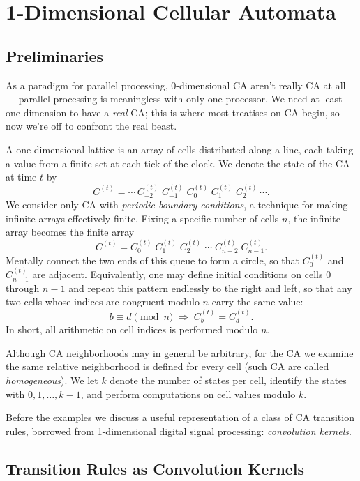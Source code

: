 \chapter{1-Dimensional Cellular Automata}

\section{Preliminaries}

As a paradigm for parallel processing, 0-dimensional CA aren't really
CA at all --- parallel processing is meaningless with only one
processor.  We need at least one dimension to have a \emph{real} CA;
this is where most treatises on CA begin, so now we're off to confront
the real beast.

A one-dimensional lattice is an array of cells distributed along a
line, each taking a value from a finite set at each tick of the clock.
We denote the state of the CA at time $t$ by
\[
  C^{(t)} = \cdots\,
  C^{(t)}_{-2}\; C^{(t)}_{-1}\; C^{(t)}_{0}\; C^{(t)}_{1}\;
  C^{(t)}_{2}\,\cdots.
\]
We consider only CA with \emph{periodic boundary conditions}, a
technique for making infinite arrays effectively finite.  Fixing a
specific number of cells $n$, the infinite array becomes the finite
array
\[
  C^{(t)} = C^{(t)}_{0}\; C^{(t)}_{1}\; C^{(t)}_{2}\;\cdots\;
  C^{(t)}_{n-2}\; C^{(t)}_{n-1}.
\]
Mentally connect the two ends of this queue to form a circle, so that
$C^{(t)}_0$ and $C^{(t)}_{n-1}$ are adjacent.  Equivalently, one may
define initial conditions on cells $0$ through $n-1$ and repeat this
pattern endlessly to the right and left, so that any two cells whose
indices are congruent modulo $n$ carry the same value:
\begin{equation}
  b \equiv d \pmod n \;\Longrightarrow\; C^{(t)}_b = C^{(t)}_d.
\end{equation}
In short, all arithmetic on cell indices is performed modulo $n$.

Although CA neighborhoods may in general be arbitrary, for the CA we
examine the same relative neighborhood is defined for every cell (such
CA are called \emph{homogeneous}).  We let $k$ denote the number of
states per cell, identify the states with $0,1,\dots,k-1$, and perform
computations on cell values modulo $k$.

Before the examples we discuss a useful representation of a class of CA
transition rules, borrowed from 1-dimensional digital signal
processing: \emph{convolution kernels}.

\section{Transition Rules as Convolution Kernels}

